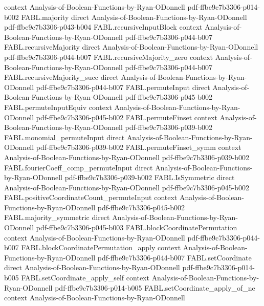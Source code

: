 \begin{theorem}
  {context}
  {Analysis-of-Boolean-Functions-by-Ryan-ODonnell}
  {pdf-ffbe9c7b3306-p014-b002}
\proofstep
  {FABL.majority}
  {direct}
  {Analysis-of-Boolean-Functions-by-Ryan-ODonnell}
  {pdf-ffbe9c7b3306-p043-b004}
\proofstep
  {FABL.recursiveInputBlock}
  {context}
  {Analysis-of-Boolean-Functions-by-Ryan-ODonnell}
  {pdf-ffbe9c7b3306-p044-b007}
\proofstep
  {FABL.recursiveMajority}
  {direct}
  {Analysis-of-Boolean-Functions-by-Ryan-ODonnell}
  {pdf-ffbe9c7b3306-p044-b007}
\proofstep
  {FABL.recursiveMajority_zero}
  {context}
  {Analysis-of-Boolean-Functions-by-Ryan-ODonnell}
  {pdf-ffbe9c7b3306-p044-b007}
\proofstep
  {FABL.recursiveMajority_succ}
  {direct}
  {Analysis-of-Boolean-Functions-by-Ryan-ODonnell}
  {pdf-ffbe9c7b3306-p044-b007}
\proofstep
  {FABL.permuteInput}
  {direct}
  {Analysis-of-Boolean-Functions-by-Ryan-ODonnell}
  {pdf-ffbe9c7b3306-p045-b002}
\proofstep
  {FABL.permuteInputEquiv}
  {context}
  {Analysis-of-Boolean-Functions-by-Ryan-ODonnell}
  {pdf-ffbe9c7b3306-p045-b002}
\proofstep
  {FABL.permuteFinset}
  {context}
  {Analysis-of-Boolean-Functions-by-Ryan-ODonnell}
  {pdf-ffbe9c7b3306-p039-b002}
\proofstep
  {FABL.monomial_permuteInput}
  {direct}
  {Analysis-of-Boolean-Functions-by-Ryan-ODonnell}
  {pdf-ffbe9c7b3306-p039-b002}
\proofstep
  {FABL.permuteFinset_symm}
  {context}
  {Analysis-of-Boolean-Functions-by-Ryan-ODonnell}
  {pdf-ffbe9c7b3306-p039-b002}
\proofstep
  {FABL.fourierCoeff_comp_permuteInput}
  {direct}
  {Analysis-of-Boolean-Functions-by-Ryan-ODonnell}
  {pdf-ffbe9c7b3306-p039-b002}
\proofstep
  {FABL.IsSymmetric}
  {direct}
  {Analysis-of-Boolean-Functions-by-Ryan-ODonnell}
  {pdf-ffbe9c7b3306-p045-b002}
\proofstep
  {FABL.positiveCoordinateCount_permuteInput}
  {context}
  {Analysis-of-Boolean-Functions-by-Ryan-ODonnell}
  {pdf-ffbe9c7b3306-p045-b002}
\proofstep
  {FABL.majority_symmetric}
  {direct}
  {Analysis-of-Boolean-Functions-by-Ryan-ODonnell}
  {pdf-ffbe9c7b3306-p045-b003}
\proofstep
  {FABL.blockCoordinatePermutation}
  {context}
  {Analysis-of-Boolean-Functions-by-Ryan-ODonnell}
  {pdf-ffbe9c7b3306-p044-b007}
\proofstep
  {FABL.blockCoordinatePermutation_apply}
  {context}
  {Analysis-of-Boolean-Functions-by-Ryan-ODonnell}
  {pdf-ffbe9c7b3306-p044-b007}
\proofstep
  {FABL.setCoordinate}
  {direct}
  {Analysis-of-Boolean-Functions-by-Ryan-ODonnell}
  {pdf-ffbe9c7b3306-p014-b005}
\proofstep
  {FABL.setCoordinate_apply_self}
  {context}
  {Analysis-of-Boolean-Functions-by-Ryan-ODonnell}
  {pdf-ffbe9c7b3306-p014-b005}
\proofstep
  {FABL.setCoordinate_apply_of_ne}
  {context}
  {Analysis-of-Boolean-Functions-by-Ryan-ODonnell}

\end{theorem}
